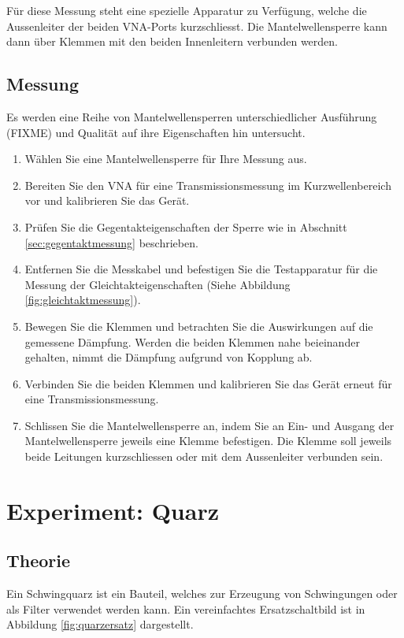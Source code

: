 \documentclass[twoside,a4paper,11pt,halfparskip,DIV=11,notitlepage]{scrartcl}
\begin{document}
Für diese Messung steht eine spezielle Apparatur zu Verfügung, welche die
Aussenleiter der beiden VNA-Ports kurzschliesst. Die Mantelwellensperre
kann dann über  Klemmen mit den beiden Innenleitern verbunden werden.

\subsection{Messung}
Es werden eine Reihe von Mantelwellensperren unterschiedlicher Ausführung
(FIXME) und Qualität auf ihre Eigenschaften hin untersucht. 

\begin{enumerate}
    \item Wählen Sie eine Mantelwellensperre für Ihre Messung aus.
    \item Bereiten Sie den VNA für eine Transmissionsmessung im Kurzwellenbereich vor und kalibrieren Sie das Gerät.
    \item Prüfen Sie die Gegentakteigenschaften der Sperre wie in Abschnitt \ref{sec:gegentaktmessung} beschrieben.
    \item Entfernen Sie die Messkabel und befestigen Sie die Testapparatur für die Messung der Gleichtakteigenschaften (Siehe Abbildung \ref{fig:gleichtaktmessung}). %
    \item Bewegen Sie die Klemmen und betrachten Sie die Auswirkungen auf die gemessene Dämpfung. Werden die beiden Klemmen nahe beieinander gehalten, nimmt die Dämpfung aufgrund von Kopplung ab.
    \item Verbinden Sie die beiden Klemmen und kalibrieren Sie das Gerät erneut für eine Transmissionsmessung.
    \item Schlissen Sie die Mantelwellensperre an, indem Sie an Ein- und Ausgang der Mantelwellensperre jeweils eine Klemme befestigen. Die Klemme soll jeweils beide Leitungen kurzschliessen oder mit dem Aussenleiter verbunden sein.
\end{enumerate}

\section{Experiment: Quarz}

\subsection{Theorie}
Ein Schwingquarz ist ein Bauteil, welches zur Erzeugung von Schwingungen oder
als Filter verwendet werden kann. Ein vereinfachtes Ersatzschaltbild ist in
Abbildung \ref{fig:quarzersatz} dargestellt. 
\end{document}
